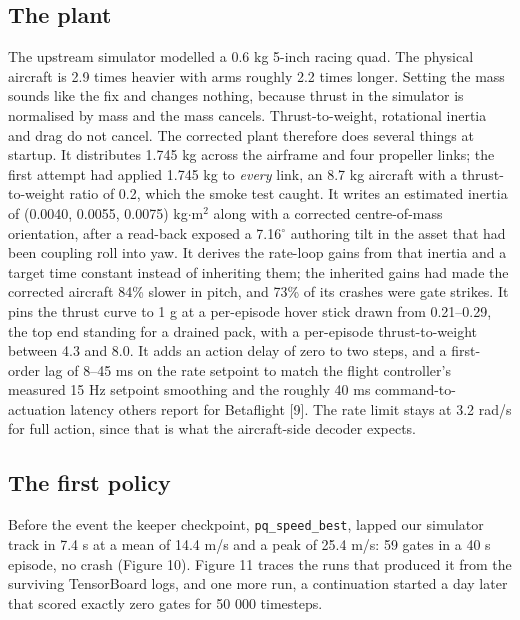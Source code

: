 \documentclass{article}
\begin{document}
\subsection{The plant}
The upstream simulator modelled a 0.6 kg 5-inch racing quad. The physical aircraft is 2.9 times heavier with arms roughly 2.2 times longer. Setting the mass sounds like the fix and changes nothing, because thrust in the simulator is normalised by mass and the mass cancels. Thrust-to-weight, rotational inertia and drag do not cancel. The corrected plant therefore does several things at startup. It distributes 1.745 kg across the airframe and four propeller links; the first attempt had applied 1.745 kg to \emph{every} link, an 8.7 kg aircraft with a thrust-to-weight ratio of 0.2, which the smoke test caught. It writes an estimated inertia of (0.0040, 0.0055, 0.0075) kg$\cdot$m$^{2}$ along with a corrected centre-of-mass orientation, after a read-back exposed a 7.16$^\circ$ authoring tilt in the asset that had been coupling roll into yaw. It derives the rate-loop gains from that inertia and a target time constant instead of inheriting them; the inherited gains had made the corrected aircraft 84\% slower in pitch, and 73\% of its crashes were gate strikes. It pins the thrust curve to 1 g at a per-episode hover stick drawn from 0.21--0.29, the top end standing for a drained pack, with a per-episode thrust-to-weight between 4.3 and 8.0. It adds an action delay of zero to two steps, and a first-order lag of 8--45 ms on the rate setpoint to match the flight controller's measured 15 Hz setpoint smoothing and the roughly 40 ms command-to-actuation latency others report for Betaflight [9]. The rate limit stays at 3.2 rad/s for full action, since that is what the aircraft-side decoder expects.

\subsection{The first policy}
Before the event the keeper checkpoint, \texttt{pq\_speed\_best}, lapped our simulator track in 7.4 s at a mean of 14.4 m/s and a peak of 25.4 m/s: 59 gates in a 40 s episode, no crash (Figure 10). Figure 11 traces the runs that produced it from the surviving TensorBoard logs, and one more run, a continuation started a day later that scored exactly zero gates for 50 000 timesteps.
\end{document}
